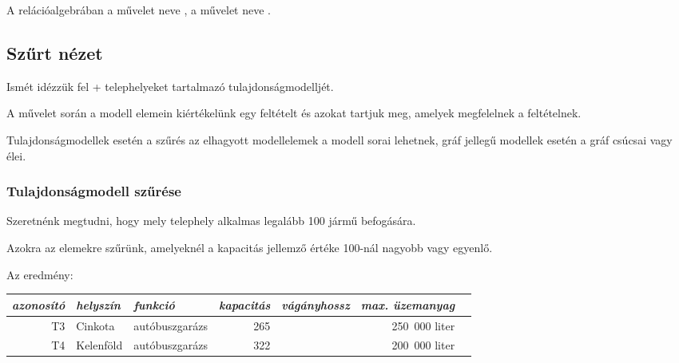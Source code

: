 \begin{megjegyzes}
	A relációalgebrában a  művelet neve , a  művelet neve .
\end{megjegyzes}

\subsection{Szűrt nézet}

Ismét idézzük fel \az+ telephelyeket tartalmazó tulajdonságmodelljét.

\begin{table}[H]
	\centering
	
\end{table}

\begin{definicio}
	A  művelet során a modell elemein kiértékelünk egy feltételt és azokat tartjuk meg, amelyek megfelelnek a feltételnek.
\end{definicio}

Tulajdonságmodellek esetén a szűrés az elhagyott modellelemek a modell sorai lehetnek, gráf jellegű modellek esetén a gráf csúcsai vagy élei.

\subsubsection{Tulajdonságmodell szűrése}

\begin{pelda}
	Szeretnénk megtudni, hogy mely telephely alkalmas legalább 100 jármű befogására.
\end{pelda}

Azokra az elemekre szűrünk, amelyeknél a \textsf{kapacitás} jellemző értéke 100-nál nagyobb vagy egyenlő.

Az eredmény:
\begin{table}[H]
	\centering
	\sf
	\centering
	\begin{tabular}{rllrrrr}
		\toprule
		\it azonosító & \it helyszín & \it funkció      & \it kapacitás & \it vágányhossz & \it max. üzemanyag &  \\ \midrule
		T3 & Cinkota      & autóbuszgarázs   &           265 &                 &      250~000 liter &  \\
		T4 & Kelenföld    & autóbuszgarázs   &           322 &                 &      200~000 liter &  \\
		\bottomrule
	\end{tabular}
\end{table}

